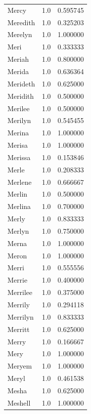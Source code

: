 \documentclass[
  letterpaper,
  DIV=11,
  numbers=noendperiod]{scrreprt}
\begin{document}
\begin{tabular}{lrr}
Mercy           &   1.0 &   0.595745 \\
Meredith        &   1.0 &   0.325203 \\
Merelyn         &   1.0 &   1.000000 \\
Meri            &   1.0 &   0.333333 \\
Meriah          &   1.0 &   0.800000 \\
Merida          &   1.0 &   0.636364 \\
Merideth        &   1.0 &   0.625000 \\
Meridith        &   1.0 &   0.500000 \\
Merilee         &   1.0 &   0.500000 \\
Merilyn         &   1.0 &   0.545455 \\
Merina          &   1.0 &   1.000000 \\
Merisa          &   1.0 &   1.000000 \\
Merissa         &   1.0 &   0.153846 \\
Merle           &   1.0 &   0.208333 \\
Merlene         &   1.0 &   0.666667 \\
Merlin          &   1.0 &   0.500000 \\
Merlina         &   1.0 &   0.700000 \\
Merly           &   1.0 &   0.833333 \\
Merlyn          &   1.0 &   0.750000 \\
Merna           &   1.0 &   1.000000 \\
Meron           &   1.0 &   1.000000 \\
Merri           &   1.0 &   0.555556 \\
Merrie          &   1.0 &   0.400000 \\
Merrilee        &   1.0 &   0.375000 \\
Merrily         &   1.0 &   0.294118 \\
Merrilyn        &   1.0 &   0.833333 \\
Merritt         &   1.0 &   0.625000 \\
Merry           &   1.0 &   0.166667 \\
Mery            &   1.0 &   1.000000 \\
Meryem          &   1.0 &   1.000000 \\
Meryl           &   1.0 &   0.461538 \\
Mesha           &   1.0 &   0.625000 \\
Meshell         &   1.0 &   1.000000 \\

\end{tabular}
\end{document}
